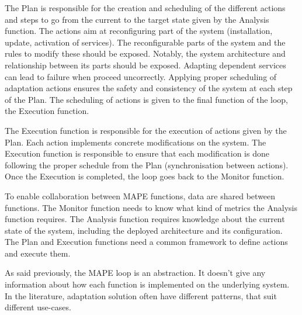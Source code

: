 \documentclass{article}
\begin{document}
The Plan is responsible for the creation and scheduling of the different actions and steps to go from the current to the target state given by the Analysis function. The actions aim at reconfiguring part of the system (\eg installation, update, activation of services). The reconfigurable parts of the system and the rules to modify these should be exposed. Notably, the system architecture and relationship between its parts should be exposed. Adapting dependent services can lead to failure when proceed uncorrectly. Applying proper scheduling of adaptation actions ensures the safety and consistency of the system at each step of the Plan. The scheduling of actions is given to the final function of the loop, the Execution function.

The Execution function is responsible for the execution of actions given by the Plan. Each action implements concrete modifications on the system. The Execution function is responsible to ensure that each modification is done following the proper schedule from the Plan (\eg synchronisation between actions). Once the Execution is completed, the loop goes back to the Monitor function.

To enable collaboration between MAPE functions, data are shared between functions. The Monitor function needs to know what kind of metrics the Analysis function requires. The Analysis function requires knowledge about the current state of the system, including the deployed architecture and its configuration. The Plan and Execution functions need a common framework to define actions and execute them.

As said previously, the MAPE loop is an abstraction. It doesn't give any information about how each function is implemented on the underlying system. In the literature, adaptation solution often have different patterns, that suit different use-cases.



\end{document}
